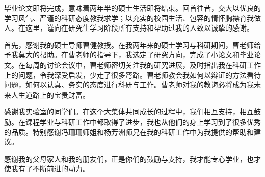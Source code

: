 \begin{thanks}

毕业论文即将完成，意味着两年半的硕士生活即将结束。回首往昔，交大以优良的学习风气、严谨的科研态度教我求学；以充实的校园生活、包容的情怀胸襟育我做人。在这里，谨向在研究生学习阶段所有支持和帮助过我的人致以诚挚的感谢。

首先，感谢我的硕士导师曹健教授。在我两年来的硕士学习与科研期间，曹老师给予我莫大的帮助。在曹老师的指导下，我选定了研究方向，完成了小论文和毕业论文。在每周的讨论会议中，曹老师密切关注我的研究进展，及时指出我在科研工作上的问题，令我深受启发，少走了很多弯路。曹老师教会我如何以辩证的方法看待问题，如何以认真、务实的态度进行科研与工作。曹老师对我的教诲必将成为我未来人生道路上的宝贵财富。

感谢我实验室的同学们。在这个大集体共同成长的过程中，我们相互支持，相互鼓励。在课程学业与科研工作中都取得了进步，我也从他们的身上学习到了很多优秀的品质。特别感谢冯珊珊师姐和杨芳洲师兄在我的科研工作中为我提供的帮助和建议。

感谢我的父母家人和我的朋友们，正是你们的鼓励与支持，我才能专心学业，也才使我有了不断前进的动力。
\end{thanks}
